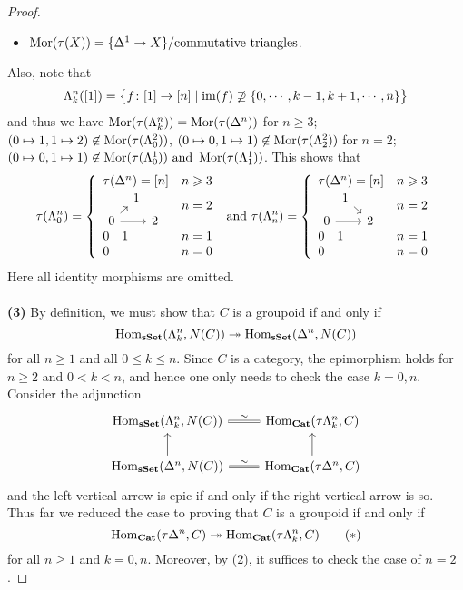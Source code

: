 \documentclass[a4paper,11pt,openany]{scrartcl}
\begin{document}
\begin{proof}
\begin{itemize}
\item $\operatorname{Mor}(\tau(X))=\{\Delta^1\to X\}/\text{commutative triangles}$.
\end{itemize}   
Also, note that
\[
\Lambda^n_k([1])=\big\{f\colon[1]\to[n]\mid \operatorname{im}(f)\not\supseteq\{0,\cdots,k-1,k+1,\cdots,n\}\big\}
\]
and thus we have $\operatorname{Mor}(\tau(\Lambda^n_k))=\operatorname{Mor}(\tau(\Delta^n))$ for $n\geqslant 3$; $(0\mapsto 1,1\mapsto2)\not\in\operatorname{Mor}(\tau(\Lambda^2_0))$, $(0\mapsto0,1\mapsto1)\not\in\operatorname{Mor}(\tau(\Lambda^2_2))$ for $n=2$; $(0\mapsto0,1\mapsto1)\not\in\operatorname{Mor}(\tau(\Lambda^1_0))\text{ and }\operatorname{Mor}(\tau(\Lambda^1_1))$. This shows that
\[
\tau(\La^n_0)=\left\{\begin{array}{ll}
\tau(\Delta^n)=[n]& n\geqslant3\\
\begin{tikzcd}[sep=tiny]
& 1&[-5pt]\\
0\arrow[ur]\arrow[rr]&& 2
\end{tikzcd}& n=2\\
0\quad1& n=1\\
0& n=0
\end{array}\right.\text{ and }
\tau(\La^n_n)=\left\{\begin{array}{ll}
\tau(\Delta^n)=[n]& n\geqslant3\\
\begin{tikzcd}[sep=tiny]
&[-5pt] 1\arrow[dr]&\\
0\arrow[rr]&& 2
\end{tikzcd}& n=2\\
0\quad1& n=1\\
0& n=0
\end{array}\right.
\]
Here all identity morphisms are omitted.\\
\\
\textbf{(3)} By definition, we must show that $C$ is a groupoid if and only if 
\[
\operatorname{Hom}_{\operatorname{\mathbf{sSet}}}(\Lambda^n_k,N(C))\twoheadrightarrow\operatorname{Hom}_{\operatorname{\mathbf{sSet}}}(\Delta^n,N(C))
\]
for all $n\geqslant1$ and all $0\leqslant k\leqslant n$. Since $C$ is a category, the epimorphism holds for $n\geqslant2$ and $0<k<n$, and hence one only needs to check the case $k=0,n$. Consider the adjunction
\[
\begin{tikzcd}
\Hom_{\sSet}(\La^n_k,N(C))\arrow[r,equal,"\sim"]& \Hom_{\Cat}(\tau\La^n_k,C)\\
\Hom_{\sSet}(\Delta^n,N(C))\arrow[u]\arrow[r,equal,"\sim"]& \Hom_{\Cat}(\tau\Delta^n,C)\arrow[u]
\end{tikzcd}
\]
and the left vertical arrow is epic if and only if the right vertical arrow is so. Thus far we reduced the case to proving that $C$ is a groupoid if and only if
\[
\operatorname{Hom}_{\operatorname{\mathbf{Cat}}}(\tau\Delta^n,C)\twoheadrightarrow\operatorname{Hom}_{\operatorname{\mathbf{Cat}}}(\tau\Lambda^n_k,C)\tag{$*$}
\]
for all $n\geqslant1$ and $k=0,n$. Moreover, by (2), it suffices to check the case of $n=2$.


\end{proof}
\end{document}
